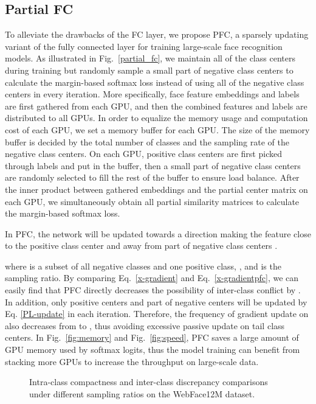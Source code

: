\documentclass[10pt,twocolumn,letterpaper]{article}
\begin{document}
\subsection{Partial FC}
To alleviate the drawbacks of the FC layer, we propose PFC, a sparsely updating variant of the fully connected layer for training large-scale face recognition models. 
As illustrated in Fig.~\ref{partial_fc}, we maintain all of the class centers during training but randomly sample a small part of negative class centers to calculate the margin-based softmax loss instead of using all of the negative class centers in every iteration. More specifically, face feature embeddings and labels are first gathered from each GPU, and then the combined features and labels are distributed to all GPUs. In order to equalize the memory usage and computation cost of each GPU, we set a memory buffer for each GPU. The size of the memory buffer is decided by the total number of classes and the sampling rate of the negative class centers. On each GPU, positive class centers are first picked through labels and put in the buffer, then a small part of negative class centers are randomly selected to fill the rest of the buffer to ensure load balance. After the inner product between gathered embeddings and the partial center matrix on each GPU, we simultaneously obtain all partial similarity matrices to calculate the margin-based softmax loss. 

In PFC, the network will be updated towards a direction making the feature  close to the positive class center  and away from part of negative class centers .

where  is a subset of all negative classes and one positive class, , and  is the sampling ratio. 
By comparing Eq.~\ref{x-gradient} and Eq.~\ref{x-gradientpfc}, we can easily find that PFC directly decreases the possibility of inter-class conflict by . In addition, only positive centers and part of negative centers will be updated by Eq. \ref{PL-update} in each iteration.
Therefore, the frequency of gradient update on  also decreases from  to , thus avoiding excessive passive update on tail class centers. In Fig.~\ref{fig:memory} and Fig.~\ref{fig:speed}, PFC saves a large amount of GPU memory used by softmax logits, thus the model training can benefit from stacking more GPUs to increase the throughput on large-scale data. 

\begin{figure}
\centering
{}
\vspace{-2mm}
\caption{Intra-class compactness and inter-class discrepancy comparisons under different sampling ratios on the WebFace12M dataset.}
\vspace{-4mm}
\label{fig:samplingproblem}
\end{figure}
\end{document}

